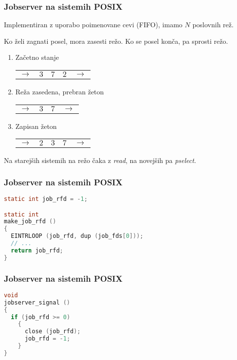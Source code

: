 \documentclass{beamer}
\begin{document}
\begin{frame}
  \frametitle{Jobserver na sistemih POSIX}

  Implementiran z uporabo poimenovane cevi (FIFO), imamo $N$ poslovnih rež.

  Ko želi zagnati posel, mora zasesti režo. Ko se posel konča, pa
  sprosti režo.
  
  \begin{enumerate}
  \item Začetno stanje
    
    \begin{tabular}{ cc|c|cc }
      \cline{2-4}
      $\rightarrow$ & $3$ & $7$ & $2$ & $\rightarrow$ \\
      \cline{2-4}
    \end{tabular}
    
  \item Reža zasedena, prebran žeton
    
    \begin{tabular}{ cc|cc }
      \cline{2-3}
      $\rightarrow$ & $3$ & $7$ & $\rightarrow$ \\
      \cline{2-3}
    \end{tabular}

  \item Zapisan žeton

    \begin{tabular}{ cc|c|cc }
      \cline{2-4}
      $\rightarrow$ & $2$ & $3$ & $7$ & $\rightarrow$ \\
      \cline{2-4}
    \end{tabular}
    
  \end{enumerate}

  Na starejših sistemih na režo čaka z \textit{read}, na novejših pa \textit{pselect}.
\end{frame}

\begin{frame}[fragile]
  \frametitle{Jobserver na sistemih POSIX}

\begin{lstlisting}[language=C, basicstyle=\sffamily]
static int job_rfd = -1;

static int
make_job_rfd ()
{
  EINTRLOOP (job_rfd, dup (job_fds[0]));
  // ...
  return job_rfd;
}
\end{lstlisting}
\end{frame}

\begin{frame}[fragile]
  \frametitle{Jobserver na sistemih POSIX}

\begin{lstlisting}[language=C, basicstyle=\sffamily]
void
jobserver_signal ()
{
  if (job_rfd >= 0)
    {
      close (job_rfd);
      job_rfd = -1;
    }
}
\end{lstlisting}
\end{frame}
\end{document}
